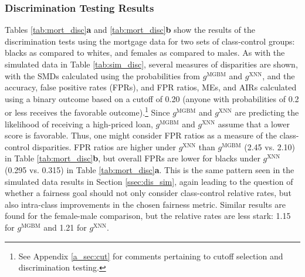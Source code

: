 \documentclass[information,article,submit,moreauthors,pdftex]{definitions/mdpi}
\begin{document}
\subsubsection{Discrimination Testing Results}\label{ssec:dis_mort}

Tables \ref{tab:mort_disc}\textbf{a} and \ref{tab:mort_disc}\textbf{b} show the results of the discrimination tests using the mortgage data for two sets of class-control groups: blacks as compared to whites, and females as compared to males. As with the simulated data in Table \ref{tab:sim_disc}, several measures of disparities are shown, with the SMDs calculated using the probabilities from $g^{\text{MGBM}}$ and $g^{\text{XNN}}$, and the accuracy, false positive rates (FPRs), and  FPR ratios, MEs, and AIRs calculated using a binary outcome based on a cutoff of 0.20 (anyone with probabilities of 0.2 or less receives the favorable outcome).\footnote{See Appendix \ref{a_sec:cut} for comments pertaining to cutoff selection and discrimination testing.} Since $g^{\text{MGBM}}$ and $g^{\text{XNN}}$  are predicting the likelihood of receiving a high-priced loan, $g^{\text{MGBM}}$ and $g^{\text{XNN}}$ assume that a lower score is favorable.  Thus, one might consider FPR ratios as a measure of the class-control disparities. FPR ratios are higher under $g^{\text{XNN}}$ than $g^{\text{MGBM}}$ (2.45 vs. 2.10) in Table \ref{tab:mort_disc}\textbf{b}, but overall FPRs are lower for blacks under $g^{\text{XNN}}$ (0.295 vs. 0.315) in Table \ref{tab:mort_disc}\textbf{a}.  This is the same pattern seen in the simulated data results in Section \ref{ssec:dis_sim}, again leading to the question of whether a fairness goal should not only consider class-control relative rates, but also intra-class improvements in the chosen fairness metric.  Similar results are found for the female-male comparison, but the relative rates are less stark: 1.15 for $g^{\text{MGBM}}$ and 1.21 for $g^{\text{XNN}}$.
\end{document}
